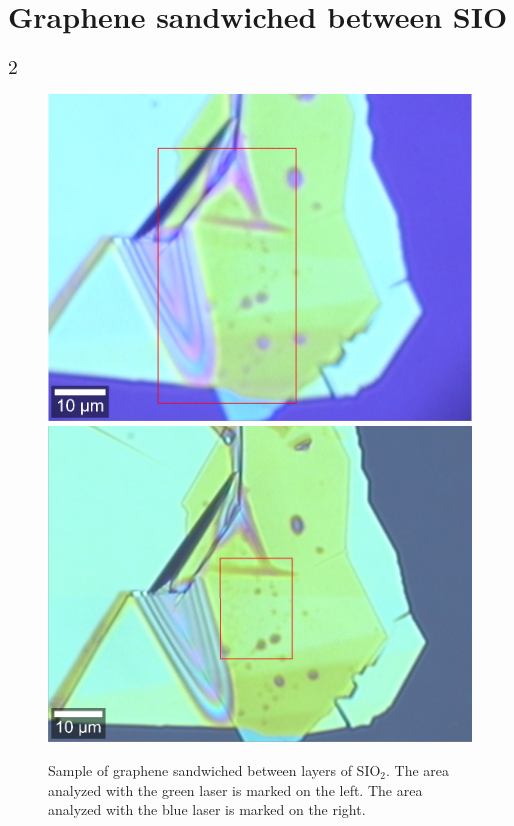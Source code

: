 \documentclass[12pt,a4paper]{article}
\begin{document}
\section{Graphene sandwiched between SIO$_2$}
\label{sec:7}

\begin{figure}
\centering
\includegraphics[scale=0.2]{Bilder/Part_3/SandwichMapOutline.png}
\includegraphics[scale=0.208]{Bilder/Part_3/SandwichBlueMap.png}
\caption{Sample of graphene sandwiched between layers of SIO$_2$. The area analyzed with the green laser is marked on the left. The area analyzed with the blue laser is marked on the right.}
\label{fig:Part3_sio2}
\end{figure}
\end{document}
